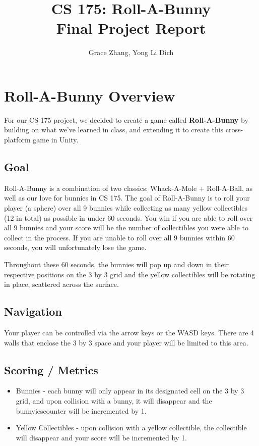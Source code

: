 \documentclass[12pt]{article}
\begin{document}
\title{%
  \textbf{CS 175: Roll-A-Bunny \\
  \large Final Project Report}}
\author{Grace Zhang, Yong Li Dich}
\date{}
\maketitle

\newpage
\tableofcontents


\newpage
 
\section{Roll-A-Bunny Overview}
  For our CS 175 project, we decided to create a game called \textbf{Roll-A-Bunny} by building on what we've learned in class, and extending it to create this cross-platform game in Unity.
\subsection{Goal}
  Roll-A-Bunny is a combination of two classics: Whack-A-Mole + Roll-A-Ball, as well as our love for bunnies in CS 175. The goal of Roll-A-Bunny is to roll your player (a sphere) over all 9 bunnies while collecting as many yellow collectibles (12 in total) as possible in under 60 seconds. 
  You win if you are able to roll over all 9 bunnies and your score will be the number of collectibles you were able to collect in the process. If you are unable to roll over all 9 bunnies within 60 seconds, you will unfortunately lose the game.

  Throughout these 60 seconds, the bunnies will pop up and down in their respective positions on the 3 by 3 grid and the yellow collectibles will be rotating in place, scattered across the surface. 
  
\subsection{Navigation}
  Your player can be controlled via the arrow keys or the WASD keys. 
  There are 4 walls that enclose the 3 by 3 space and your player will be limited to this area. 

\subsection{Scoring / Metrics}
\begin{itemize}
  \item Bunnies - each bunny will only appear in its designated cell on the 3 by 3 grid, and upon collision with a bunny, it will disappear and the bunnyiescounter will be incremented by 1. 
  \item Yellow Collectibles - upon collision with a yellow collectible, the collectible will disappear and your score will be incremented by 1.
\end{itemize}
\end{document}
